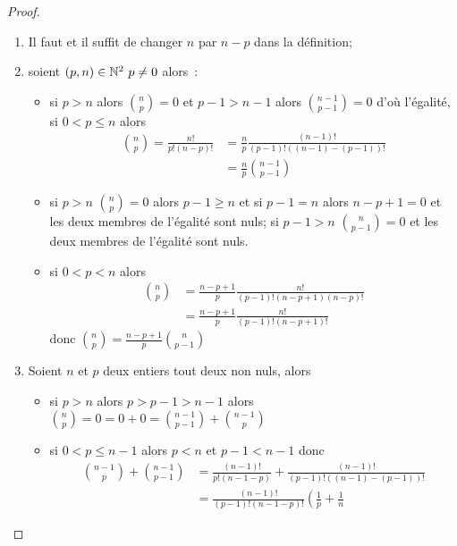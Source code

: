 \begin{proof}
  \begin{enumerate}
    \item Il faut et il suffit de changer \(n\) par \(n - p\) dans la 
      définition;
    \item soient \((p, n)\in\mathbb{N}^2\ p\neq 0\) alors~:
      \begin{itemize}
        \item si \(p > n\) alors \(\binom{n}{p} = 0\) et \(p - 1 > n - 1\) alors 
          \(\binom{n - 1}{p - 1} = 0\) d'où l'égalité, si \(0 < p \leqslant n\) 
          alors
          \begin{align}
            \binom{n}{p} = \frac{n!}{p!(n - p)!}
          & = \frac{n}{p}\frac{(n - 1)!}{(p - 1)!((n - 1)-(p - 1))!}\\
          & = \frac{n}{p}\binom{n - 1}{p - 1}
          \end{align}
        \item si \(p > n\) \(\binom{n}{p} = 0\) alors \(p - 1\geqslant n\) et si 
          \(p - 1 = n\) alors \(n - p + 1 = 0\) et les deux membres de l'égalité 
          sont nuls; si \(p - 1 > n\)  \(\binom{n}{p - 1} = 0\) et les deux 
          membres de l'égalité sont nuls.
        \item si \(0 < p < n\) alors
          \begin{align}
            \binom{n}{p}& = \frac{n - p + 1}{p}\frac{n!}{(p - 1)!(n - p + 1)(n - 
            p)!}\\
                        & = \frac{n - p + 1}{p}\frac{n!}{(p - 1)!(n - p + 1)!}
            \end{align}
            donc \(\binom{n}{p} = \frac{n - p + 1}{p}\binom{n}{p - 1}\)
      \end{itemize}
    \item Soient \(n\) et \(p\) deux entiers tout deux non nuls, alors
      \begin{itemize}
        \item si \(p > n\) alors \(p > p - 1 > n - 1\) alors \(\binom{n}{p} = 
          0 = 0 + 0 = \binom{n - 1}{p - 1} + \binom{n - 1}{p}\)
        \item si \(0 < p \leqslant n - 1\) alors \(p < n\) et \(p - 1 < n - 
          1\) donc
          \begin{align}
            \binom{n - 1}{p}+\binom{n - 1}{p - 1}
            &= \frac{(n - 1)!}{p!(n - 1 - p)}+\frac{(n - 1)!}{(p - 1)!((n - 
            1)-(p - 1))!}\\
            &= \frac{(n - 1)!}{(p - 1)!(n - 1 - p)!}\left(\frac{1}{p}+\frac{1}{n 
}
\end{align}
\end{itemize}
\end{enumerate}
\end{proof}
